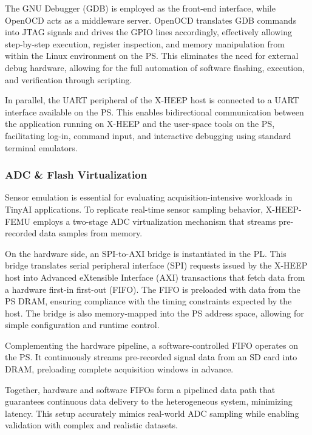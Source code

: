                 The GNU Debugger (GDB) is employed as the front-end interface, while OpenOCD acts as a middleware server. OpenOCD translates GDB commands into JTAG signals and drives the GPIO lines accordingly, effectively allowing step-by-step execution, register inspection, and memory manipulation from within the Linux environment on the PS. This eliminates the need for external debug hardware, allowing for the full automation of software flashing, execution, and verification through scripting.
                
                In parallel, the UART peripheral of the \mbox{X-HEEP} host is connected to a UART interface available on the PS. This enables bidirectional communication between the application running on \mbox{X-HEEP} and the user-space tools on the PS, facilitating log-in, command input, and interactive debugging using standard terminal emulators.
        
            \subsubsection*{ADC \& Flash Virtualization}
            
                Sensor emulation is essential for evaluating acquisition-intensive workloads in TinyAI applications. To replicate real-time sensor sampling behavior, \mbox{X-HEEP-FEMU} employs a two-stage ADC virtualization mechanism that streams pre-recorded data samples from memory.
                
                On the hardware side, an SPI-to-AXI bridge is instantiated in the PL. This bridge translates serial peripheral interface (SPI) requests issued by the \mbox{X-HEEP} host into Advanced eXtensible Interface (AXI) transactions that fetch data from a hardware first-in first-out (FIFO). The FIFO is preloaded with data from the PS DRAM, ensuring compliance with the timing constraints expected by the host. The bridge is also memory-mapped into the PS address space, allowing for simple configuration and runtime control.
                
                Complementing the hardware pipeline, a software-controlled FIFO operates on the PS. It continuously streams pre-recorded signal data from an SD card into DRAM, preloading complete acquisition windows in advance.
                
                Together, hardware and software FIFOs form a pipelined data path that guarantees continuous data delivery to the heterogeneous system, minimizing latency. This setup accurately mimics real-world ADC sampling while enabling validation with complex and realistic datasets.
                
